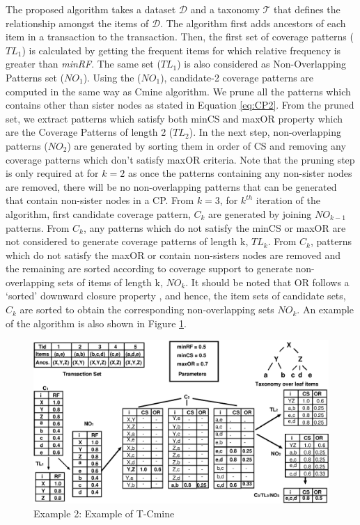 The proposed algorithm takes a dataset $\mathcal{D}$ and a taxonomy $\mathcal{T}$ that defines the relationship amongst the items of $\mathcal{D}$. The algorithm first adds ancestors of each item in a transaction to the transaction. Then, the first set of coverage patterns ($TL_{1}$) is calculated by getting the frequent items for which relative frequency is greater than \textit{minRF}. The same set ($TL_{1}$) is also considered as Non-Overlapping Patterns set ($NO_{1}$). Using the ($NO_{1}$), candidate-2 coverage patterns are computed in the same way as Cmine algorithm. We prune all the patterns which contains other than sister nodes as stated in Equation \ref{eq:CP2}. From the pruned set, we extract patterns which satisfy both minCS and maxOR property which are the Coverage Patterns of length 2 ($TL_{2}$). In the next step, non-overlapping patterns ($NO_{2}$) are generated by sorting them in order of CS and removing any coverage patterns which don't satisfy maxOR criteria. Note that the pruning step is only required at for $k=2$ as once the patterns containing any non-sister nodes are removed, there will be no non-overlapping patterns that can be generated that contain non-sister nodes in  a CP. 
From $k=3$, for $k^{th}$ iteration of the algorithm, first candidate coverage pattern, $C_{k}$ are generated by joining $NO_{k-1}$ patterns. From $C_{k}$, any patterns which do not satisfy the minCS or maxOR are not considered to generate coverage patterns of length k, $TL_{k}$. From $C_{k}$, patterns which do not satisfy the maxOR or contain non-sisters nodes are removed and the remaining are sorted according to coverage support to generate non-overlapping sets of items of length k, $NO_{k}$. It should be noted that OR follows a `sorted' downward closure property \cite{srinivas2014mining}, and hence, the item sets of candidate sets, $C_{k}$ are sorted to obtain the corresponding non-overlapping sets $NO_{k}$. An example of the algorithm is also shown in Figure \ref{tcmine}. 

\begin{figure}
  \centering
\includegraphics[scale=0.7]{visuals/T-Cmine.eps}
  \caption{Example 2: Example of T-Cmine}
  \label{tcmine}
\end{figure}




